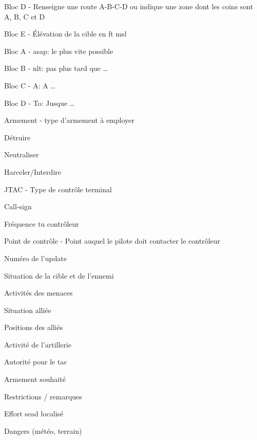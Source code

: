 \begin{e2}
\begin{e3}
		\item Bloc D - Renseigne une route A-B-C-D ou indique une zone dont les coins sont A, B, C et D
		\item Bloc E - Élévation de la cible en \gls{ft} \gls{msl}
	\end{e3}
	\begin{e3}
		\item Bloc A - \acrshort{asap}: le plus vite possible
		\item Bloc B - \acrshort{nlt}: pas plus tard que \ldots{}
		\item Bloc C - A: A \ldots{}
		\item Bloc D - To: Jusque \ldots{}
	\end{e3}
	\begin{e3}
		\item Armement - type d'armement à employer
		\item Détruire
		\item Neutraliser
		\item Harceler/Interdire
	\end{e3}
	\begin{e3}
		\item JTAC - Type de contrôle terminal
		\item Call-sign
		\item Fréquence tu contrôleur
		\item Point de contrôle - Point auquel le pilote doit contacter le contrôleur
	\end{e3}
	\begin{e3}
		\item Numéro de l'update
		\item Situation de la cible et de l'ennemi
		\item Activités des menaces
		\item Situation alliée
		\item Positions des alliés
		\item Activité de l'artillerie
		\item Autorité pour le \gls{tac}
		\item Armement souhaité
		\item Restrictions / remarques
		\item Effort \gls{sead} localisé
		\item Dangers (météo, terrain)
	\end{e3}


\end{e2}
